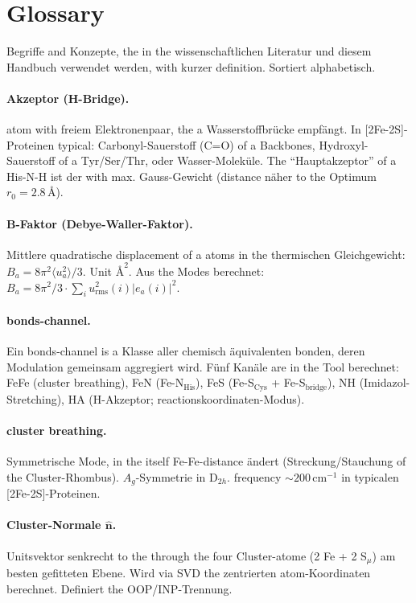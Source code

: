 \documentclass[11pt,a4paper,twoside]{article}
\providecommand{\angstrom}{\text{\AA}}    %
\theoremstyle{remark}
\begin{document}
\section{Glossary}
\label{app:glossary}

Begriffe and Konzepte, the in the wissenschaftlichen Literatur und
diesem Handbuch verwendet werden, with kurzer definition. Sortiert
alphabetisch.

\paragraph{Akzeptor (H-Bridge).}
atom with freiem Elektronenpaar, the a Wasserstoffbr\"ucke
empf\"angt. In [2Fe-2S]-Proteinen typical: Carbonyl-Sauerstoff
(C=O) of a Backbones, Hydroxyl-Sauerstoff of a Tyr/Ser/Thr,
oder Wasser-Molek\"ule. The "`Hauptakzeptor"' of a His-N-H ist
der with max. Gauss-Gewicht (distance n\"aher to the Optimum
$r_0 = 2.8\,\angstrom$).

\paragraph{B-Faktor (Debye-Waller-Faktor).}
Mittlere quadratische displacement of a atoms in the thermischen
Gleichgewicht: $B_a = 8\pi^2\langle u_a^2\rangle/3$. Unit
$\angstrom^2$. Aus the Modes berechnet:
$B_a = 8\pi^2/3 \cdot \sum_i u_\text{rms}^2(i) |e_a(i)|^2$.

\paragraph{bonds-channel.}
Ein bonds-channel is a Klasse aller chemisch \"aquivalenten
bonden, deren Modulation gemeinsam aggregiert wird. F\"unf
Kan\"ale are in the Tool berechnet: FeFe (cluster breathing), FeN
(Fe-N$_\text{His}$), FeS (Fe-S$_\text{Cys}$ + Fe-S$_\text{bridge}$),
NH (Imidazol-Stretching), HA (H-Akzeptor; reactionskoordinaten-Modus).

\paragraph{cluster breathing.}
Symmetrische Mode, in the itself Fe-Fe-distance \"andert
(Streckung/Stauchung of the Cluster-Rhombus). $A_g$-Symmetrie in
D$_{2h}$. frequency $\sim 200$\,cm$^{-1}$ in
typicalen [2Fe-2S]-Proteinen.

\paragraph{Cluster-Normale $\hat{\mathbf{n}}$.}
Unitsvektor senkrecht to the through the four Cluster-atome (2 Fe + 2 S$_\mu$)
am besten gefitteten Ebene. Wird via SVD the zentrierten
atom-Koordinaten berechnet. Definiert the OOP/INP-Trennung.
\end{document}
